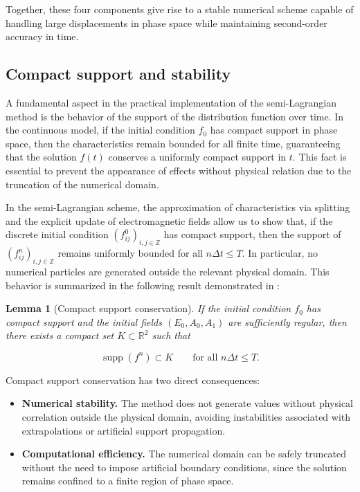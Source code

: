 \documentclass[11pt,a4paper,twoside,pdf]{article}
\numberwithin{equation}{section}
\newtheorem{lemma}[theorem]{Lemma}
\begin{document}
\medskip

Together, these four components give rise to a stable numerical scheme capable of handling large displacements in phase space while maintaining second-order accuracy in time.






\subsection{Compact support and stability}

A fundamental aspect in the practical implementation of the semi-Lagrangian method is the behavior of the support of the distribution function over time. In the continuous model, if the initial condition $f_0$ has compact support in phase space, then the characteristics remain bounded for all finite time, guaranteeing that the solution $f(t)$ conserves a uniformly compact support in $t$. This fact is essential to prevent the appearance of effects without physical relation due to the truncation of the numerical domain.

In the semi-Lagrangian scheme, the approximation of characteristics via splitting and the explicit update of electromagnetic fields allow us to show that, if the discrete initial condition $(f^0_{ij})_{i,j\in\mathbb{Z}}$ has compact support, then the support of $(f^n_{ij})_{i,j\in\mathbb{Z}}$ remains uniformly bounded for all $n\Delta t\le T$. In particular, no numerical particles are generated outside the relevant physical domain. This behavior is summarized in the following result demonstrated in \cite{bostan2009convergence}:

\begin{lemma}[Compact support conservation]
If the initial condition $f_0$ has compact support and the initial fields $(E_0,A_0,A_1)$ are sufficiently regular, then there exists a compact set $K\subset\mathbb{R}^2$ such that


\[
\operatorname{supp}(f^n)\subset K \qquad \text{for all } n\Delta t\le T.
\]


\end{lemma}

Compact support conservation has two direct consequences:

\begin{itemize}
\item \textbf{Numerical stability.}
The method does not generate values without physical correlation outside the physical domain, avoiding instabilities associated with extrapolations or artificial support propagation.

\item \textbf{Computational efficiency.}
The numerical domain can be safely truncated without the need to impose artificial boundary conditions, since the solution remains confined to a finite region of phase space.
\end{itemize}
\end{document}
